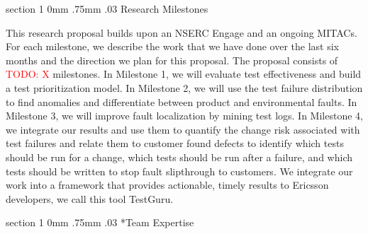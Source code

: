 \documentclass[12pt, letterpaper]{article}
\makeatletter
\newcommand{\todo}[1]{\textcolor{red}{TODO: #1}\PackageWarning{TODO:}{#1!}}
\renewcommand{\section}{\@startsection
{section}%
{1}%
{0mm}%
{.75mm}
{.03\baselineskip}%
{\normalfont\large\bf} %
}
\makeatother
\begin{document}
\fancyhead{}
\pagestyle{fancy}
\renewcommand{\headrulewidth}{0pt}

\begin{center}
\begin{LARGE}
\noindent
{}
\end{LARGE}
\end{center}






\section{Research Milestones} 

This research proposal builds upon an NSERC Engage and an ongoing MITACs. For
each milestone, we describe the work that we have done over the last six months
and the direction we plan for this proposal. The proposal consists of \todo{X}
milestones. In Milestone 1, we will evaluate test effectiveness and build a
test prioritization model. In Milestone 2, we will use the test failure
distribution to find anomalies and differentiate between product and
environmental faults. In Milestone 3, we will improve fault localization by
mining test logs. In Milestone 4, we integrate our results and use them to
quantify the change risk associated with test failures and relate them to
customer found defects to identify which tests should be run for a change,
which tests should be run after a failure, and which tests should be written to
stop fault slipthrough to customers.  We integrate our work into a framework
that provides actionable, timely results to Ericsson developers, we call this
tool TestGuru.









\section*{Team Expertise}
\end{document}
